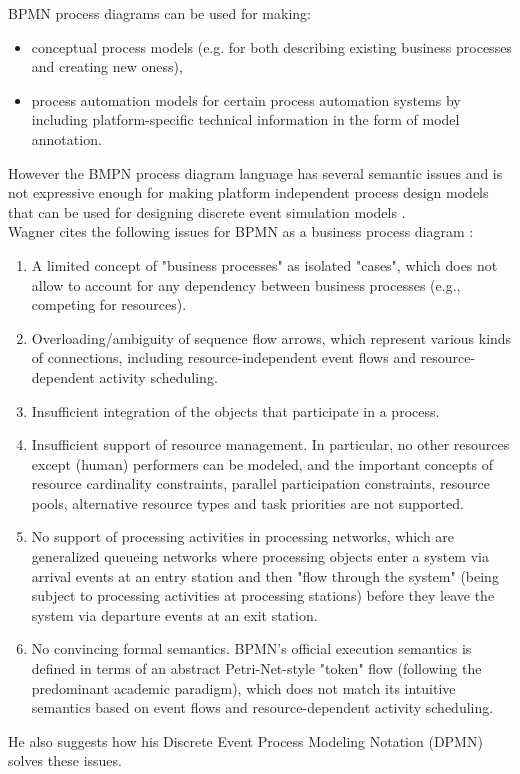 \documentclass{article}
\begin{document}
BPMN process diagrams can be used for making:

\begin{itemize}
\item conceptual process models (e.g. for both describing existing business processes and creating new oness),
\item process automation models for certain process automation systems by including platform-specific technical information in the form of model annotation.
\end{itemize}
However the BMPN process diagram language has several semantic issues and is not expressive enough for making platform independent process design models that can be used for designing discrete event simulation models \cite{Wagner}. \\
Wagner cites the following issues for BPMN as a business process diagram \cite{Wagner}:
\begin{enumerate}
\item A limited concept of "business processes" as isolated "cases", which does not allow to account for any dependency between business processes (e.g., competing for resources).
\item Overloading/ambiguity of sequence flow arrows, which represent various kinds of connections, including resource-independent event flows and resource-dependent activity scheduling.
\item Insufficient integration of the objects that participate in a process.
\item Insufficient support of resource management. In particular, no other resources except (human) performers can be modeled, and the important concepts of resource cardinality constraints, parallel participation constraints, resource pools, alternative resource types and task priorities are not supported.
\item No support of processing activities in processing networks, which are generalized queueing networks where processing objects enter a system via arrival events at an entry station and then "flow through the system" (being subject to processing activities at processing stations) before they leave the system via departure events at an exit station.
\item No convincing formal semantics. BPMN's official execution semantics is defined in terms of an abstract Petri-Net-style "token" flow (following the predominant academic paradigm), which does not match its intuitive semantics based on event flows and resource-dependent activity scheduling.
\end{enumerate}
He also suggests how his Discrete Event Process Modeling Notation (DPMN) solves these issues.
\end{document}
